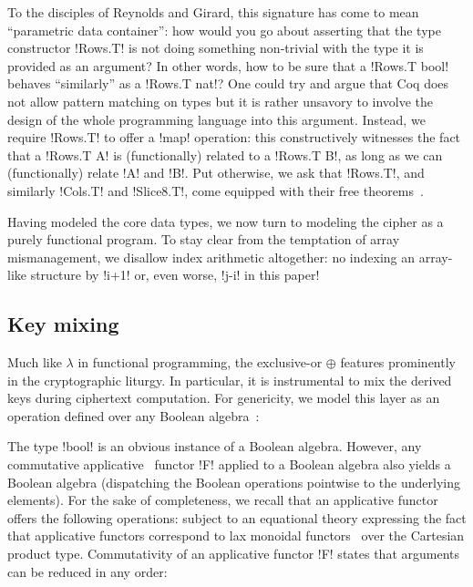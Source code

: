 \documentclass[draft,english]{jflart}
\begin{document}
To the disciples of Reynolds and Girard, this signature has come to
mean ``parametric data container'': how would you go about asserting
that the type constructor \coqe!Rows.T! is not doing something
non-trivial with the type it is provided as an argument? In other
words, how to be sure that a \coqe!Rows.T bool! behaves ``similarly''
as a \coqe!Rows.T nat!? One could try and argue that Coq does not
allow pattern matching on types but it is rather unsavory to involve
the design of the whole programming language into this argument.
%
Instead, we require \coqe!Rows.T! to offer a \coqe!map! operation: this
constructively witnesses the fact that a \coqe!Rows.T A! is
(functionally) related to a \coqe!Rows.T B!, as long as we can
(functionally) relate \coqe!A! and \coqe!B!. Put otherwise, we ask
that \coqe!Rows.T!, and similarly \coqe!Cols.T! and \coqe!Slice8.T!,
come equipped with their free theorems~\citep{reynolds:parametricity,
  wadler:free-theorem}.


Having modeled the core data types, we now turn to modeling the cipher
as a purely functional program. To stay clear from the temptation of
array mismanagement, we disallow index arithmetic altogether: no
indexing an array-like structure by \coqe!i+1! or, even worse,
\coqe!j-i! in this paper!

\subsection{Key mixing}


Much like $\lambda$ in functional programming, the exclusive-or
$\oplus$ features prominently in the cryptographic liturgy. In
particular, it is instrumental to mix the derived keys during
ciphertext computation. For genericity, we model this layer as an
operation defined over any Boolean
algebra~\citep{givant:boolean-algebras}:
%


The type \coqe!bool! is an obvious instance of a Boolean algebra.
However, any commutative applicative~\citep{mcbride:applicative}
functor \coqe!F! applied to a Boolean algebra also yields a Boolean
algebra (dispatching the Boolean operations pointwise to the
underlying elements). For the sake of completeness, we recall that an
applicative functor offers the following operations:
%
%
subject to an equational theory expressing the fact that applicative
functors correspond to lax monoidal
functors~\citep{maclane:working-categorist} over the Cartesian product
type. Commutativity of an applicative functor \coqe!F! states that
arguments can be reduced in any order:
%
\end{document}
